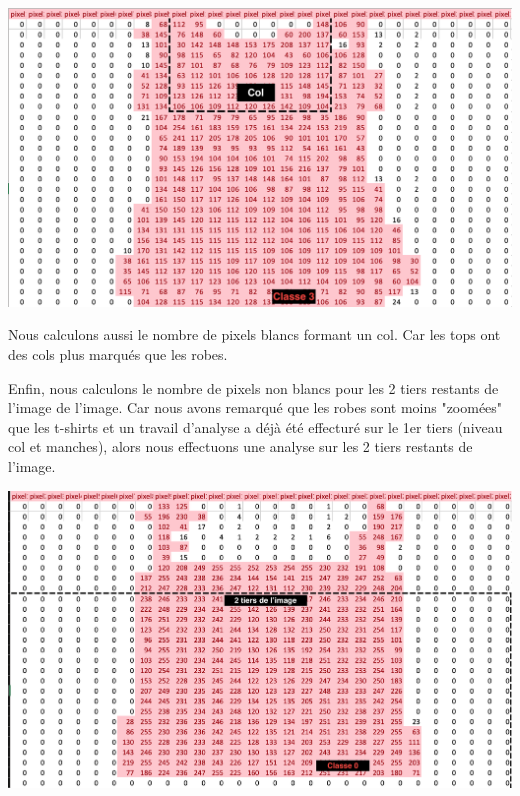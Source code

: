 \documentclass[a4paper,10pt]{article}
\begin{document}
		\begin{minipage}{0.4\linewidth}
			\includegraphics[scale = 0.15]{fichiers/ex_robe.PNG}		
		\end{minipage}\hfill
		\begin{minipage}{0.55\linewidth}
			Nous calculons aussi le nombre de pixels blancs formant un col. Car les tops ont des cols plus marqués que les robes.\\
		\end{minipage}

		\begin{minipage}{0.55\linewidth}
			Enfin, nous calculons le nombre de pixels non blancs pour les 2 tiers restants de l'image de l’image. Car nous avons remarqué que les robes sont moins "zoomées" que les t-shirts et un travail d'analyse a déjà été effecturé sur le 1er tiers (niveau col et manches), alors nous effectuons une analyse sur les 2 tiers restants de l'image.
		\end{minipage}\hfill
		\begin{minipage}{0.4\linewidth}
			\includegraphics[scale = 0.10]{fichiers/ex_tshirt.png}	
		\end{minipage}
		
\end{document}
